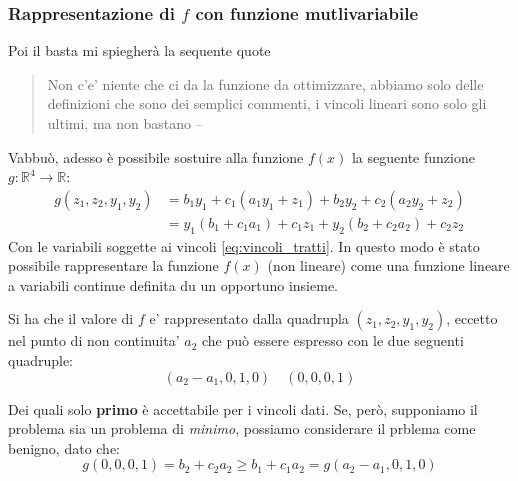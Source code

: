 
\subsubsection{Rappresentazione di $f$ con funzione mutlivariabile}
Poi il basta mi spiegherà la sequente quote 
\begin{quote}
  Non c'e' niente che ci da la funzione da ottimizzare, abbiamo solo delle definizioni che sono dei semplici commenti, i vincoli lineari sono solo gli ultimi, ma non bastano
  \hfill -- \faWhatsapp  
\end{quote}

Vabbuò, adesso è possibile sostuire alla funzione $f(x)$ la seguente funzione $g:\mathbb{R}^4\to \mathbb{R}$:
\[
  \begin{aligned}
    g(z_1, z_2, y_1,y_2 ) &= b_1y_1 + c_1(a_1y_1+z_1) + b_2y_2 + c_2(a_2y_2 + z_2) \\
    &= y_1(b_1+c_1a_1)+c_1z_1 + y_2(b_2+c_2a_2) + c_2z_2
  \end{aligned}
\]
Con le variabili soggette ai vincoli \ref{eq:vincoli_tratti}. In questo modo è stato possibile rappresentare la funzione $f(x)$ (non lineare) come una funzione lineare a variabili continue definita du un opportuno insieme.

Si ha che il valore di $ f $ e' rappresentato  dalla quadrupla $(z_1, z_2,y_1,y_2)$, eccetto nel punto di non continuita' $a_2$ che può essere espresso con le due seguenti quadruple:
\[
  (a_2 - a_1, 0, 1, 0) \quad (0, 0, 0, 1)
\] 

Dei quali solo \textbf{primo} è accettabile per i vincoli dati. Se, però, supponiamo il problema sia un problema di \textit{minimo}, possiamo considerare il prblema come benigno, dato che:
\[
  g(0,0,0,1) = b_2+c_2a_2 \geq b_1+c_1a_2 = g(a_2-a_1,0,1,0)
\]

